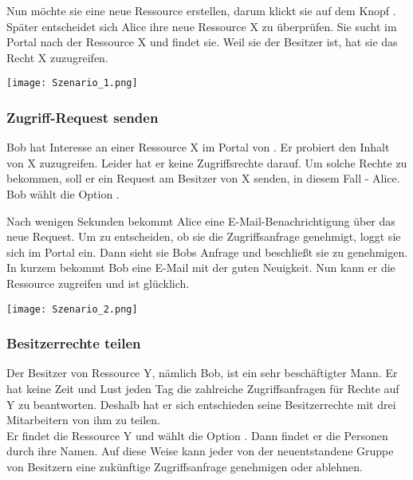 \documentclass[parskip=full,11pt]{scrartcl}
\begin{document}
Nun möchte sie eine neue Ressource erstellen, darum klickt sie auf dem Knopf \grqq. Später entscheidet sich Alice ihre neue Ressource X zu überprüfen. Sie sucht im Portal nach der Ressource X und findet sie. Weil sie der Besitzer ist, hat sie das Recht X zuzugreifen.\\

	\begin{center}
	\texttt{[image: Szenario\_1.png]}
	\end{center}
\newpage
\subsubsection*{Zugriff-Request senden}
Bob hat Interesse an einer Ressource X im Portal von \grqq. Er probiert den Inhalt von X zuzugreifen. Leider hat er keine Zugriffsrechte darauf. Um solche Rechte zu bekommen, soll er ein Request am Besitzer von X senden, in diesem Fall - Alice. Bob wählt die Option \grqq. 

Nach wenigen Sekunden bekommt Alice eine E-Mail-Benachrichtigung über das neue Request. Um zu entscheiden, ob sie die Zugriffsanfrage genehmigt, loggt sie sich im Portal ein. Dann sieht sie Bobs Anfrage und beschließt sie zu genehmigen. In kurzem bekommt Bob eine E-Mail mit der guten Neuigkeit. Nun kann er die Ressource zugreifen und ist glücklich.\\
	
	\begin{center}
	\texttt{[image: Szenario\_2.png]}
	\end{center}

\newpage
\subsubsection*{Besitzerrechte teilen}
Der Besitzer von Ressource Y, nämlich Bob, ist ein sehr beschäftigter Mann. Er hat keine Zeit und Lust jeden Tag die zahlreiche Zugriffsanfragen für Rechte auf Y zu beantworten. Deshalb hat er sich entschieden seine Besitzerrechte mit drei Mitarbeitern von ihm zu teilen. \\
Er findet die Ressource Y und wählt die Option \grqq. Dann findet er die Personen durch ihre Namen. Auf diese Weise kann jeder von der neuentstandene Gruppe von Besitzern eine zukünftige Zugriffsanfrage genehmigen oder ablehnen.\\
\end{document}
